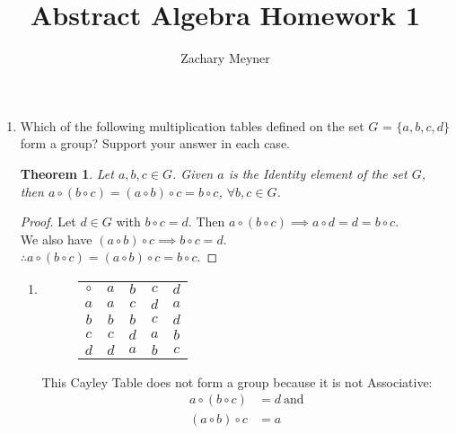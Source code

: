 \documentclass[12pt]{article}
\title{\large Abstract Algebra Homework 1}
\author{\large Zachary Meyner}
\date{}
\newlength{\strutheight}
\newtheorem{theorem}{Theorem}
\newcommand\setitemnumber[1]{\setcounter{enumi}{\numexpr#1-1\relax}}
\begin{document}
\maketitle
\begin{enumerate}[label=\textbf{\arabic*}.]
	\setitemnumber{2}
	\item Which of the following multiplication tables defined on the set $G$ = $\{a,b,c,d\}$ form a
	      group? Support your answer in each case.
	      \begin{theorem}
		      Let $a,b,c \in G$. Given $a$ is the Identity element of the set $G$, \\
		      then \(a \circ (b \circ c) = (a \circ b) \circ c = b \circ c\), \(\forall b,c \in G\).
	      \end{theorem}
	      \begin{proof}
		      Let $d \in G$ with $b \circ c = d$. Then \(a \circ (b \circ c) \implies a \circ d = d = b \circ c\). \\
		      We also have \((a \circ b) \circ c \implies b \circ c = d\). \\
		      \(\therefore a \circ (b \circ c) = (a \circ b) \circ c = b \circ c\).
	      \end{proof}
	      \begin{enumerate}
		      \item \begin{adjustbox}{valign=T,raise=\strutheight,minipage={1.0\linewidth}}
			            \begin{wrapfigure}{l}{0pt}
				            \begin{tabular}{c|cccc}
					            $\circ$ & $a$ & $b$ & $c$ & $d$ \\
					            \cline{1-5}
					            $a$     & $a$ & $c$ & $d$ & $a$ \\
					            $b$     & $b$ & $b$ & $c$ & $d$ \\
					            $c$     & $c$ & $d$ & $a$ & $b$ \\
					            $d$     & $d$ & $a$ & $b$ & $c$ \\
				            \end{tabular}
			            \end{wrapfigure}
			            This Cayley Table does not form a group because it is not Associative:
			            \begin{align*}
				            a \circ (b \circ c)          & = d \ \text{and}         \\
				            (a \circ b) \circ c          & = a                      \\

\end{align*}
\end{adjustbox}
\end{enumerate}
\end{enumerate}
\end{document}
